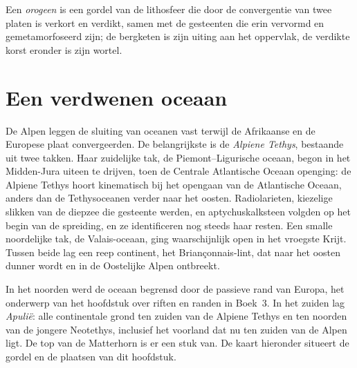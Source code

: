 \begin{definition}[Orogeen]\label{def:b2:alpine-orogen:orogen}
Een \emph{orogeen} is een gordel van de lithosfeer die door de
convergentie van twee platen is verkort en verdikt, samen met de gesteenten die erin vervormd en gemetamorfoseerd zijn; de
bergketen is zijn uiting aan het oppervlak, de verdikte korst eronder is zijn wortel.
\end{definition}

\section{Een verdwenen oceaan}\label{sec:b2:alpine-orogen:tethys}

De Alpen leggen de sluiting van oceanen vast terwijl de Afrikaanse en de Europese plaat convergeerden.
De belangrijkste is de \emph{Alpiene Tethys}, bestaande uit twee takken. Haar zuidelijke tak, de
Piemont--Ligurische oceaan, begon in het Midden-Jura uiteen te drijven, toen de Centrale Atlantische
Oceaan openging: de Alpiene Tethys hoort kinematisch bij het opengaan van de Atlantische Oceaan, anders dan de
Tethysoceanen verder naar het oosten. Radiolarieten, kiezelige slikken van de diepzee die gesteente werden,
en aptychuskalksteen volgden op het begin van de spreiding, en ze identificeren nog steeds haar
resten. Een smalle noordelijke tak, de Valais-oceaan, ging waarschijnlijk open in het vroegste
Krijt. Tussen beide lag een reep continent, het Briançonnais-lint, dat naar het oosten
dunner wordt en in de Oostelijke Alpen ontbreekt.

In het noorden werd de oceaan begrensd door de passieve rand van Europa, het onderwerp van het hoofdstuk over
riften en randen in Boek~3. In het zuiden lag \emph{Apulië}: alle continentale
grond ten zuiden van de Alpiene Tethys en ten noorden van de jongere Neotethys, inclusief het voorland
dat nu ten zuiden van de Alpen ligt. De top van de Matterhorn is er een stuk van.
De kaart hieronder situeert de gordel en de plaatsen van dit hoofdstuk.

